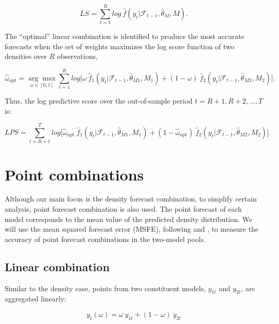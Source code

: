 \documentclass{monashthesis}
\begin{document}
\begin{equation}
\label{eqn:LS1}
LS = \sum^R_{t=1} log \ \hat f(y_t| \mathcal{F}_{t-1}, \hat\theta_M, M).
\end{equation}

The ``optimal'' linear combination is identified to produce the most accurate forecasts when the set of weights maximizes the log score function of two densities over \(R\) observations,

\begin{equation}
\label{eqn:LS2}
\hat{\omega}_{\text{opt}} =  \underset{\omega \in [0,1]}{\arg\max} \sum^R_{t=1} log \Big[ \omega \ \hat f_1(y_t| \mathcal{F}_{t-1}, \hat\theta_{M1}, M_1) + (1-\omega) \ \hat f_2(y_t| \mathcal{F}_{t-1}, \hat\theta_{M2}, M_2)\Big].
\end{equation}

Thus, the log predictive score over the out-of-sample period \(t = R+1, R+2, \dots, T\) is:

\begin{equation}
\label{eqn:LS3}
LPS = \sum^T_{t = R+1} log \Big[ \hat{\omega}_{\text{opt}} \ \hat f_1(y_t| \mathcal{F}_{t-1}, \hat\theta_{M1}, M_1) + (1- \hat{\omega}_{\text{opt}}) \ \hat f_2(y_t| \mathcal{F}_{t-1}, \hat\theta_{M2}, M_2)\Big].
\end{equation}

\hypertarget{point-combinations}{%
\section{Point combinations}\label{point-combinations}}

Although our main focus is the density forecast combination, to simplify certain analysis, point forecast combination is also used. The point forecast of each model corresponds to the mean value of the predicted density distribution. We will use the mean squared forecast error (MSFE), following \textcite{BG69} and \textcite{SW09}, to measure the accuracy of point forecast combinations in the two-model pools.

\hypertarget{linear-combination}{%
\subsection{Linear combination}\label{linear-combination}}

Similar to the density case, points from two constituent models, \(y_{1t}\) and \(y_{2t}\), are aggregated linearly:

\begin{equation}
\label{eqn:PC1}
y_t({\omega}) = \omega \ y_{1t} + (1-\omega) \ y_{2t}
\end{equation}
\end{document}
